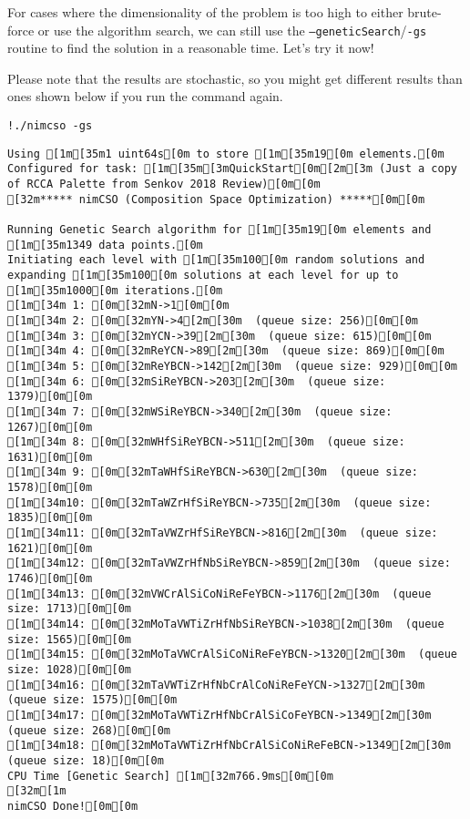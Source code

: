 For cases where the dimensionality of the problem is too high to either
brute-force or use the algorithm search, we can still use the
\texttt{--geneticSearch}/\texttt{-gs}
routine to find the solution in a reasonable time. Let's try it now!

Please note that the results are stochastic, so you might get different
results than ones shown below if you run the command again.

\begin{verbatim}
!./nimcso -gs
\end{verbatim}

\begin{verbatim}
Using [1m[35m1 uint64s[0m to store [1m[35m19[0m elements.[0m
Configured for task: [1m[35m[3mQuickStart[0m[2m[3m (Just a copy of RCCA Palette from Senkov 2018 Review)[0m[0m
[32m***** nimCSO (Composition Space Optimization) *****[0m[0m

Running Genetic Search algorithm for [1m[35m19[0m elements and [1m[35m1349 data points.[0m
Initiating each level with [1m[35m100[0m random solutions and expanding [1m[35m100[0m solutions at each level for up to [1m[35m1000[0m iterations.[0m
[1m[34m 1: [0m[32mN->1[0m[0m
[1m[34m 2: [0m[32mYN->4[2m[30m  (queue size: 256)[0m[0m
[1m[34m 3: [0m[32mYCN->39[2m[30m  (queue size: 615)[0m[0m
[1m[34m 4: [0m[32mReYCN->89[2m[30m  (queue size: 869)[0m[0m
[1m[34m 5: [0m[32mReYBCN->142[2m[30m  (queue size: 929)[0m[0m
[1m[34m 6: [0m[32mSiReYBCN->203[2m[30m  (queue size: 1379)[0m[0m
[1m[34m 7: [0m[32mWSiReYBCN->340[2m[30m  (queue size: 1267)[0m[0m
[1m[34m 8: [0m[32mWHfSiReYBCN->511[2m[30m  (queue size: 1631)[0m[0m
[1m[34m 9: [0m[32mTaWHfSiReYBCN->630[2m[30m  (queue size: 1578)[0m[0m
[1m[34m10: [0m[32mTaWZrHfSiReYBCN->735[2m[30m  (queue size: 1835)[0m[0m
[1m[34m11: [0m[32mTaVWZrHfSiReYBCN->816[2m[30m  (queue size: 1621)[0m[0m
[1m[34m12: [0m[32mTaVWZrHfNbSiReYBCN->859[2m[30m  (queue size: 1746)[0m[0m
[1m[34m13: [0m[32mVWCrAlSiCoNiReFeYBCN->1176[2m[30m  (queue size: 1713)[0m[0m
[1m[34m14: [0m[32mMoTaVWTiZrHfNbSiReYBCN->1038[2m[30m  (queue size: 1565)[0m[0m
[1m[34m15: [0m[32mMoTaVWCrAlSiCoNiReFeYBCN->1320[2m[30m  (queue size: 1028)[0m[0m
[1m[34m16: [0m[32mTaVWTiZrHfNbCrAlCoNiReFeYCN->1327[2m[30m  (queue size: 1575)[0m[0m
[1m[34m17: [0m[32mMoTaVWTiZrHfNbCrAlSiCoFeYBCN->1349[2m[30m  (queue size: 268)[0m[0m
[1m[34m18: [0m[32mMoTaVWTiZrHfNbCrAlSiCoNiReFeBCN->1349[2m[30m  (queue size: 18)[0m[0m
CPU Time [Genetic Search] [1m[32m766.9ms[0m[0m
[32m[1m
nimCSO Done![0m[0m
\end{verbatim}

